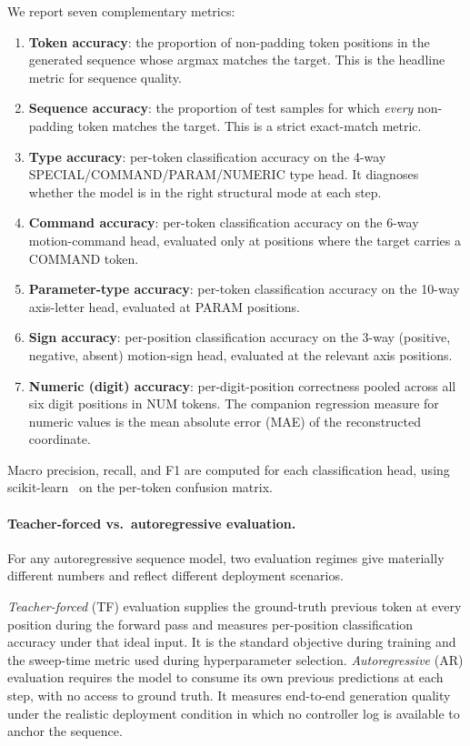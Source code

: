 \documentclass[sensors,article,submit,moreauthors,pdftex]{Definitions/mdpi}
\begin{document}
We report seven complementary metrics:

\begin{enumerate}
\item \textbf{Token accuracy}: the proportion of non-padding token positions in the generated sequence whose argmax matches the target. This is the headline metric for sequence quality.
\item \textbf{Sequence accuracy}: the proportion of test samples for which \emph{every} non-padding token matches the target. This is a strict exact-match metric.
\item \textbf{Type accuracy}: per-token classification accuracy on the 4-way SPECIAL/COMMAND/PARAM/NUMERIC type head. It diagnoses whether the model is in the right structural mode at each step.
\item \textbf{Command accuracy}: per-token classification accuracy on the 6-way motion-command head, evaluated only at positions where the target carries a COMMAND token.
\item \textbf{Parameter-type accuracy}: per-token classification accuracy on the 10-way axis-letter head, evaluated at PARAM positions.
\item \textbf{Sign accuracy}: per-position classification accuracy on the 3-way (positive, negative, absent) motion-sign head, evaluated at the relevant axis positions.
\item \textbf{Numeric (digit) accuracy}: per-digit-position correctness pooled across all six digit positions in NUM tokens. The companion regression measure for numeric values is the mean absolute error (MAE) of the reconstructed coordinate.
\end{enumerate}

Macro precision, recall, and F1 are computed for each classification head, using scikit-learn~\cite{pedregosa2011sklearn} on the per-token confusion matrix.

\paragraph{Teacher-forced vs.\ autoregressive evaluation.} For any autoregressive sequence model, two evaluation regimes give materially different numbers and reflect different deployment scenarios.

\emph{Teacher-forced} (TF) evaluation supplies the ground-truth previous token at every position during the forward pass and measures per-position classification accuracy under that ideal input. It is the standard objective during training and the sweep-time metric used during hyperparameter selection. \emph{Autoregressive} (AR) evaluation requires the model to consume its own previous predictions at each step, with no access to ground truth. It measures end-to-end generation quality under the realistic deployment condition in which no controller log is available to anchor the sequence.
\end{document}
